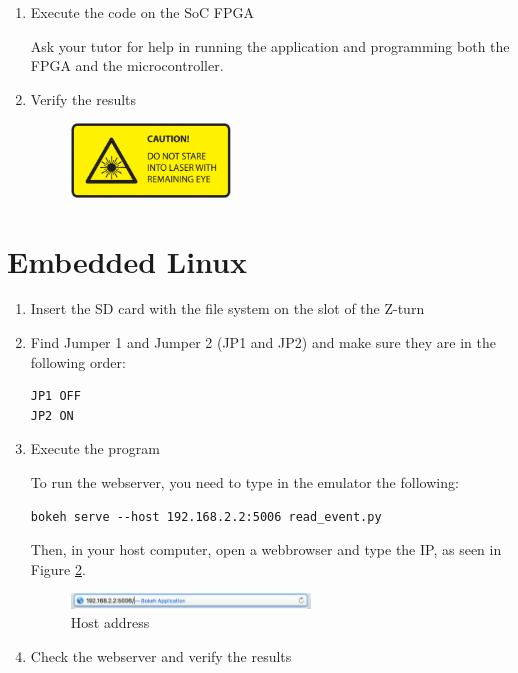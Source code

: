 \documentclass{article}
\begin{document}
\begin{enumerate}
\item  Execute the code on the SoC FPGA

Ask your tutor for help in running the application and programming both the FPGA and the microcontroller.

\item  Verify the results

\begin{figure}[h!]
    \centering
    \includegraphics[width=0.4\textwidth]{img/laser.png}
    \label{fig:block_diagram_system}
\end{figure}

\end{enumerate}

\section{Embedded Linux}
\begin{enumerate}
\item  Insert the SD card with the file system on the slot of the Z-turn

\item Find Jumper 1 and Jumper 2 (JP1 and JP2) and make sure they are in the following order:
\begin{verbatim}
JP1 OFF 
JP2 ON
\end{verbatim}


\item Execute the program

To run the webserver, you need to type in the emulator the following:

   \begin{tcolorbox}
        \begin{verbatim}
bokeh serve --host 192.168.2.2:5006 read_event.py
        \end{verbatim}
    \end{tcolorbox}

Then, in your host computer, open a webbrowser and type the IP, as seen in Figure \ref{fig:bokeh}.

\begin{figure}[h!]
    \centering
    \includegraphics[width=0.6\textwidth]{img/bokeh.png}
    \caption{Host address}
    \label{fig:bokeh}
\end{figure}

\item Check the webserver and verify the results
\end{enumerate}
\end{document}
